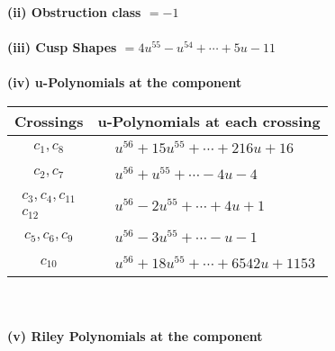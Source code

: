 \documentclass[1p]{elsarticle_modified}
\theoremstyle{definition}
\begin{document}
\flushleft \textbf{(ii) Obstruction class $= -1$}\\~\\
\flushleft \textbf{(iii) Cusp Shapes $= 4 u^{55}- u^{54}+\cdots+5 u-11$}\\~\\
\newpage\renewcommand{\arraystretch}{1}
\flushleft \textbf{(iv) u-Polynomials at the component}\newline \\
\begin{tabular}{m{50pt}|m{274pt}}
Crossings & \hspace{64pt}u-Polynomials at each crossing \\
\hline $$\begin{aligned}c_{1},c_{8}\end{aligned}$$&$\begin{aligned}
&u^{56}+15 u^{55}+\cdots+216 u+16
\end{aligned}$\\
\hline $$\begin{aligned}c_{2},c_{7}\end{aligned}$$&$\begin{aligned}
&u^{56}+u^{55}+\cdots-4 u-4
\end{aligned}$\\
\hline $$\begin{aligned}c_{3},c_{4},c_{11}\\c_{12}\end{aligned}$$&$\begin{aligned}
&u^{56}-2 u^{55}+\cdots+4 u+1
\end{aligned}$\\
\hline $$\begin{aligned}c_{5},c_{6},c_{9}\end{aligned}$$&$\begin{aligned}
&u^{56}-3 u^{55}+\cdots- u-1
\end{aligned}$\\
\hline $$\begin{aligned}c_{10}\end{aligned}$$&$\begin{aligned}
&u^{56}+18 u^{55}+\cdots+6542 u+1153
\end{aligned}$\\
\hline
\end{tabular}\\~\\
\newpage\renewcommand{\arraystretch}{1}
\flushleft \textbf{(v) Riley Polynomials at the component}\newline \\
\end{document}
